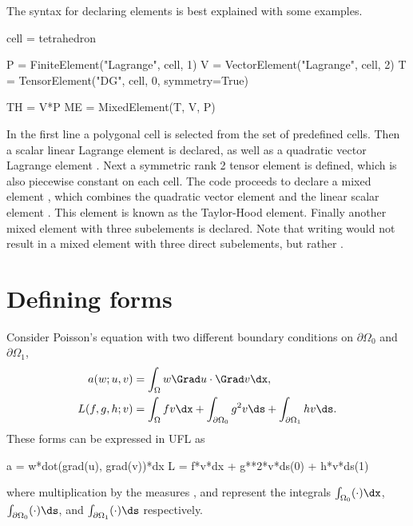 The syntax for declaring elements is best explained with some
examples.
\begin{uflcode}
cell = tetrahedron

P = FiniteElement("Lagrange", cell, 1)
V = VectorElement("Lagrange", cell, 2)
T = TensorElement("DG", cell, 0, symmetry=True)

TH = V*P
ME = MixedElement(T, V, P)
\end{uflcode}
In the first line a polygonal cell is selected from the set of
predefined cells.  Then a scalar linear Lagrange element  is
declared, as well as a quadratic vector Lagrange element .
Next a symmetric rank 2 tensor element  is defined, which is
also piecewise constant on each cell. The code proceeds to declare a
mixed element , which combines the quadratic vector element
 and the linear scalar element . This element is known
as the Taylor-Hood element.  Finally another mixed element with three
subelements is declared. Note that writing  would not
result in a mixed element with three direct subelements, but rather
.

\section{Defining forms}
\label{ufl:sec:forms}

Consider Poisson's equation with two different boundary
conditions on $\partial\Omega_0$ and $\partial\Omega_1$,
\begin{align}
a(w; u, v) &= \int_\Omega w \Grad u \cdot \Grad v \dx, \\
L(f, g, h; v) &= \int_\Omega f v \dx + \int_{\partial\Omega_0} g^2 v \ds + \int_{\partial\Omega_1} h v \ds.
\end{align}
These forms can be expressed in UFL as
\begin{uflcode}
a = w*dot(grad(u), grad(v))*dx
L = f*v*dx + g**2*v*ds(0) + h*v*ds(1)
\end{uflcode}
where multiplication by the measures ,  and 
represent the integrals $\int_{\Omega_0} (\cdot) \dx$,
$\int_{\partial\Omega_0} (\cdot) \ds$,
and $\int_{\partial\Omega_1} (\cdot) \ds$
respectively.

